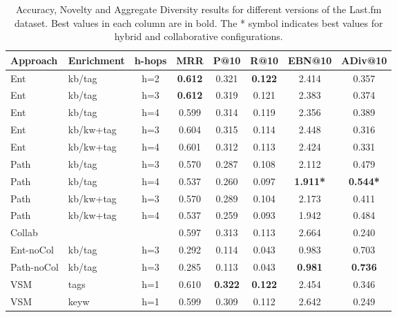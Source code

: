 \begin{table}
\scriptsize
	\label{tbl:graph-rec:Res_sf}
	\begin{tabular}{l l c c c c c c }
		\toprule
		\textbf{Approach} & \textbf{Enrichment} & \textbf{h-hops} &  \textbf{MRR} &  \textbf{P@10} & \textbf{R@10} & \textbf{EBN@10}  & \textbf{ADiv@10}\\
		\midrule
		Ent & kb/tag & h=2 & \textbf{0.612} & 0.321 & \textbf{0.122} & 2.414 & 0.357 \\
		Ent & kb/tag & h=3 & \textbf{0.612} & 0.319 & 0.121 & 2.383 & 0.374 \\
		Ent & kb/tag & h=4 & 0.599 & 0.314 & 0.119 & 2.356 & 0.389 \\
		Ent & kb/kw+tag & h=3 & 0.604 & 0.315 & 0.114 & 2.448 & 0.316 \\
		Ent & kb/kw+tag & h=4 & 0.601 & 0.312 & 0.113 & 2.424 & 0.331 \\
		Path & kb/tag & h=3 & 0.570 & 0.287 & 0.108 & 2.112 & 0.479 \\
		Path & kb/tag & h=4 & 0.537 & 0.260 & 0.097 & \textbf{1.911*} & \textbf{0.544*} \\
		Path & kb/kw+tag & h=3 & 0.570 & 0.289 & 0.104 & 2.173 & 0.411 \\
		Path & kb/kw+tag & h=4 & 0.537 & 0.259 & 0.093 & 1.942 & 0.484 \\
		\midrule
		Collab & & & 0.597 & 0.313 & 0.113 & 2.664 & 0.240 \\	
		Ent-noCol & kb/tag & h=3 & 0.292 & 0.114 & 0.043 & 0.983 & 0.703 \\
		Path-noCol & kb/tag & h=3 &0.285  & 0.113 & 0.043 & \textbf{0.981} & \textbf{0.736} \\
		VSM & tags & h=1 & 0.610 & \textbf{0.322} & \textbf{0.122} & 2.454 & 0.346 \\
		VSM & keyw & h=1 & 0.599 & 0.309 & 0.112 & 2.642 & 0.249 \\
		\bottomrule		
	\end{tabular}
	\caption{Accuracy, Novelty and Aggregate Diversity results for different versions of the Last.fm dataset. Best values in each column are in bold. The * symbol indicates best values for hybrid and collaborative configurations. 
	}
\end{table}

